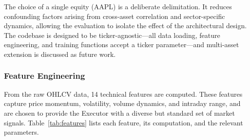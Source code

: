The choice of a single equity (AAPL) is a deliberate delimitation. It reduces
confounding factors arising from cross-asset correlation and sector-specific
dynamics, allowing the evaluation to isolate the effect of the architectural
design. The codebase is designed to be ticker-agnostic---all data loading,
feature engineering, and training functions accept a ticker parameter---and
multi-asset extension is discussed as future work.

\subsubsection{Feature Engineering} \label{sec:feature_engineering}

From the raw OHLCV data, 14 technical features are computed. These features
capture price momentum, volatility, volume dynamics, and intraday range, and
are chosen to provide the Executor with a diverse but standard set of market
signals. Table~\ref{tab:features} lists each feature, its computation, and the
relevant parameters.

